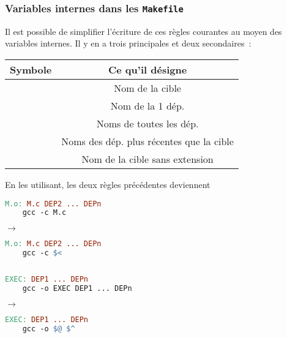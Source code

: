 \begin{frame}[fragile]
\frametitle{Variables internes dans les {\tt Makefile}}
Il est possible de simplifier l'écriture de ces règles courantes au moyen
des \alert{variables internes}. Il y en a trois principales et deux
secondaires~:
\begin{center}
    \begin{tabular}{c|c}
        Symbole & Ce qu'il désigne \\ \hline \hline
        \Code{\$@} & Nom de la cible \\
        \Code{\$<} & Nom de la 1\iere{} dép. \\
        \Code{\$\textasciicircum} & Noms de toutes les dép. \\ \hline
        \Code{\$?} & Noms des dép. plus récentes que la cible \\
        \Code{\$*} & Nom de la cible sans extension
    \end{tabular}
\end{center}
\medskip

En les utilisant, les deux règles précédentes deviennent

\begin{minipage}[c]{.4\textwidth}
\begin{lstlisting}[language=make,numbers=none,basicstyle=\footnotesize\tt]
M.o: M.c DEP2 ... DEPn
    gcc -c M.c
\end{lstlisting}
\end{minipage}
\hspace{1em}
$\longrightarrow$
\hspace{2em}
\begin{minipage}[c]{.35\textwidth}
\begin{lstlisting}[language=make,numbers=none,basicstyle=\footnotesize\tt]
M.o: M.c DEP2 ... DEPn
    gcc -c $<
\end{lstlisting}
\begin{math}\end{math}
\end{minipage}

\begin{minipage}[c]{.4\textwidth}
\begin{lstlisting}[language=make,numbers=none,basicstyle=\footnotesize\tt]
EXEC: DEP1 ... DEPn
    gcc -o EXEC DEP1 ... DEPn
\end{lstlisting}
\end{minipage}
\hspace{1em}
$\longrightarrow$
\hspace{2em}
\begin{minipage}[c]{.35\textwidth}
\begin{lstlisting}[language=make,numbers=none,basicstyle=\footnotesize\tt]
EXEC: DEP1 ... DEPn
    gcc -o $@ $^
\end{lstlisting}
\begin{math}\end{math}
\end{minipage}
\end{frame}

